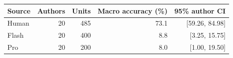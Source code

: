 \begin{tabular}{lrrrr}
\toprule
Source & Authors & Units & Macro accuracy (\%) & 95\% author CI \\
\midrule
Human & 20 & 485 & 73.1 & [59.26, 84.98] \\
Flash & 20 & 400 & 8.8 & [3.25, 15.75] \\
Pro & 20 & 200 & 8.0 & [1.00, 19.50] \\
\bottomrule
\end{tabular}
